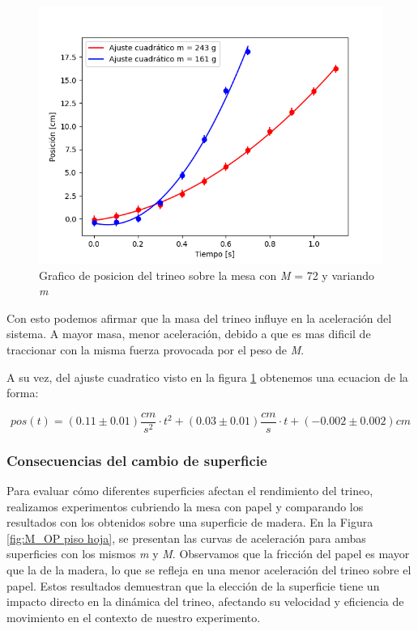 \documentclass[12pt,a4]{article}
\begin{document}
\begin{figure}[H]
    \centering
    \includegraphics{ajuste2_PisoMaderaMPB_O.png}
    \caption{Grafico de posicion del trineo sobre la mesa con \textit{M} = 72 y variando \textit{m}}
    \label{fig:M_OP piso trineo}
\end{figure}

Con esto podemos afirmar que la masa del trineo influye en la aceleración del sistema. A mayor masa, menor aceleración, debido a que es mas dificil de traccionar con la misma fuerza provocada por el peso de \textit{M}.

A su vez, del ajuste cuadratico visto en la figura \ref{fig:M_OP piso trineo} obtenemos una ecuacion de la forma:

\[
pos(t) = (0.11 \pm 0.01) \frac{cm}{s^2} \cdot t^2 + (0.03 \pm 0.01) \frac{cm}{s} \cdot t + (-0.002 \pm 0.002) cm
\]

\subsubsection*{Consecuencias del cambio de superficie}

Para evaluar cómo diferentes superficies afectan el rendimiento del trineo, realizamos experimentos cubriendo la mesa con papel y comparando los resultados con los obtenidos sobre una superficie de madera. En la Figura \ref{fig:M_OP piso hoja}, se presentan las curvas de aceleración para ambas superficies con los mismos \textit{m} y \textit{M}. Observamos que la fricción del papel es mayor que la de la madera, lo que se refleja en una menor aceleración del trineo sobre el papel. Estos resultados demuestran que la elección de la superficie tiene un impacto directo en la dinámica del trineo, afectando su velocidad y eficiencia de movimiento en el contexto de nuestro experimento.
\end{document}
